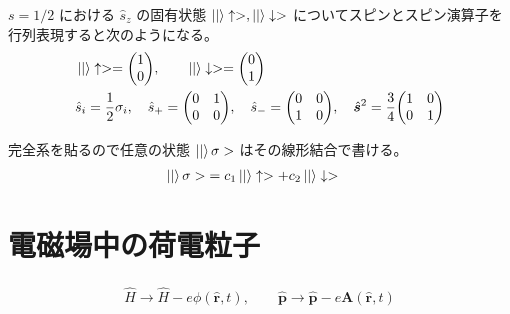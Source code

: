 \documentclass[uplatex,dvipdfmx,a4paper,11pt]{jlreq}
\renewcommand{\AA}{\bm{A}}
\newcommand{\rr}{\bm{r}}
\newcommand{\pp}{\bm{p}}
\numberwithin{equation}{section}
\theoremstyle{definition}
\begin{document}
\begin{theorem}
  $s = 1/2$ における $\hat{s}_z$ の固有状態 $\ket|\uparrow>, \ket|\downarrow>$ についてスピンとスピン演算子を行列表現すると次のようになる。
  \begin{align}
                                        & \ket|\uparrow> = \mqty(1               \\ 0), \qquad
    \ket|\downarrow> = \mqty(0                                                   \\ 1) \\
                                        & \hat{s}_i = \frac{1}{2}\sigma_i, \quad
    \hat{s}_+ = \mqty(0                 & 1                                      \\ 0 & 0), \quad
    \hat{s}_- = \mqty(0                 & 0                                      \\ 1 & 0), \quad
    \hat{\bm{s}}^2 = \frac{3}{4}\mqty(1 & 0                                      \\ 0 & 1)
  \end{align}
\end{theorem}

\begin{proposition}
  完全系を貼るので任意の状態 $\ket|\sigma>$ はその線形結合で書ける。
  \begin{align}
    \ket|\sigma> & = c_1\ket|\uparrow> + c_2\ket|\downarrow>
  \end{align}
\end{proposition}



\section{電磁場中の荷電粒子}
\begin{align}
  \hat{H}\to\hat{H} - e\phi(\hat{\rr}, t), \qquad \hat{\pp} \to \hat{\pp} - e\AA(\hat{\rr}, t)
\end{align}
\end{document}
